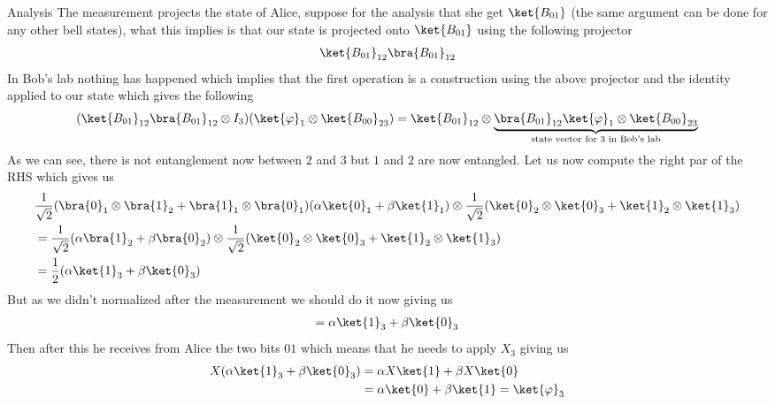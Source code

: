 \begin{parag}{Analysis}
    The measurement projects the state of Alice, suppose for the analysis that she get $\ket{B_{01}}$ (the same argument can be done for any other bell states), what this implies is that our state is projected onto $\ket{B_{01}}$ using the following projector
	\begin{align*} 
		\ket{B_{01}}_{12}\bra{B_{01}}_{12}
	\end{align*}
	In Bob's lab nothing has happened which implies that the first operation is a construction using the above projector and the identity applied to our state which gives the following 
	\begin{align*} 
	\left(\ket{B_{01}}_{12}\bra{B_{01}}_{12} \otimes I_3\right)\left(\ket{\varphi}_1 \otimes \ket{B_{00}}_{23}\right) = \ket{B_{01}}_{12} \otimes \underbrace{\bra{B_{01}}_{12} \ket{\phi}_1 \otimes \ket{B_{00}}_{23}}_{\text{state vector for 3 in Bob's lab}} 
	\end{align*}
	As we can see, there is not entanglement now between $2$ and $3$ but $1$ and $2$ are now entangled. Let us now compute the right par of the RHS which gives us 
	\begin{align*} 
		&\frac{1}{\sqrt{2}} \left(\bra{0}_1 \otimes \bra{1}_2 + \bra{1}_1 \otimes \bra{0}_1\right)\left(\alpha \ket{0}_1 + \beta \ket{1}_1\right) \otimes \frac{1}{\sqrt{2}}\left(\ket{0}_2 \otimes \ket{0}_3 + \ket{1}_2 \otimes \ket{1}_3\right)\\
		&= \frac{1}{\sqrt{2}} \left(\alpha \bra{1}_2 + \beta \bra{0}_2\right) \otimes \frac{1}{\sqrt{2}} \left(\ket{0}_2 \otimes \ket{0}_3 + \ket{1}_2 \otimes \ket{1}_3\right) \\
		&= \frac{1}{2}\left(\alpha \ket{1}_3 + \beta \ket{0}_3\right)
	\end{align*}
	But as we didn't normalized after the measurement we should do it now giving us 
	\begin{align*} 
		=  \alpha \ket{1}_3 + \beta \ket{0}_3
	\end{align*}
	Then after this he receives from Alice the two bits $01$ which means that he needs to apply $X_3$ giving us 
	\begin{align*} 
		X\left(\alpha \ket{1}_3 + \beta \ket{0}_3\right) &= \alpha X \ket{1} + \beta X \ket{0}\\
		 &= \alpha \ket{0} + \beta \ket{1} =  \ket{\varphi}_3
	\end{align*}
\end{parag}



